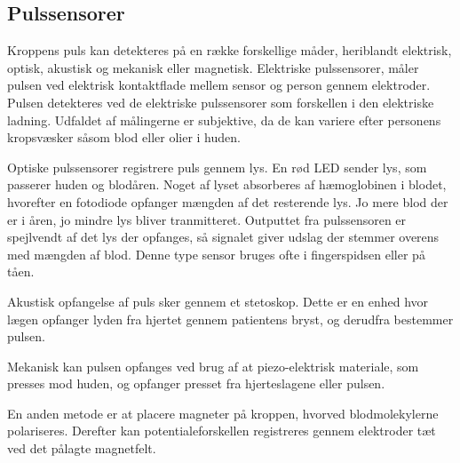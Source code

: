 \subsection{Pulssensorer}
Kroppens puls kan detekteres på en række forskellige måder, heriblandt elektrisk, optisk, akustisk og mekanisk eller magnetisk. 
\newline
Elektriske pulssensorer, måler pulsen ved elektrisk kontaktflade mellem sensor og person gennem elektroder. Pulsen detekteres ved de elektriske pulssensorer som forskellen i den elektriske ladning. Udfaldet af målingerne er subjektive, da de kan variere efter personens kropsvæsker såsom blod eller olier i huden. 

Optiske pulssensorer registrere puls gennem lys. En rød LED sender lys, som passerer huden og blodåren. Noget af lyset absorberes af hæmoglobinen i blodet, hvorefter en fotodiode opfanger mængden af det resterende lys. Jo mere blod der er i åren, jo mindre lys bliver tranmitteret. Outputtet fra pulssensoren er spejlvendt af det lys der opfanges, så signalet giver udslag der stemmer overens med mængden af blod. Denne type sensor bruges ofte i fingerspidsen eller på tåen. 

Akustisk opfangelse af puls sker gennem et stetoskop. Dette er en enhed hvor lægen opfanger lyden fra hjertet gennem patientens bryst, og derudfra bestemmer pulsen. 

Mekanisk kan pulsen opfanges ved brug af at piezo-elektrisk materiale, som presses mod huden, og opfanger presset fra hjerteslagene eller pulsen. 

En anden metode er at placere magneter på kroppen, hvorved blodmolekylerne polariseres. Derefter kan potentialeforskellen registreres gennem elektroder tæt ved det pålagte magnetfelt. 